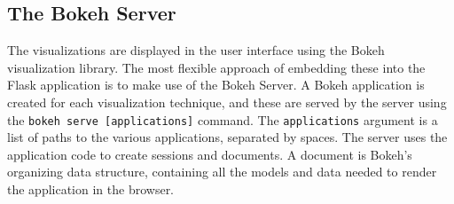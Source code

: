 \subsection{The Bokeh Server}

The visualizations are displayed in the user interface using the Bokeh visualization library. The most flexible approach of embedding these into the Flask application is to make use of the Bokeh Server. A Bokeh application is created for each visualization technique, and these are served by the server using the \texttt{bokeh serve [applications]} command. The \texttt{applications} argument is a list of paths to the various applications, separated by spaces. The server uses the application code to create sessions and documents. A document is Bokeh's organizing data structure, containing all the models and data needed to render the application in the browser.\\

